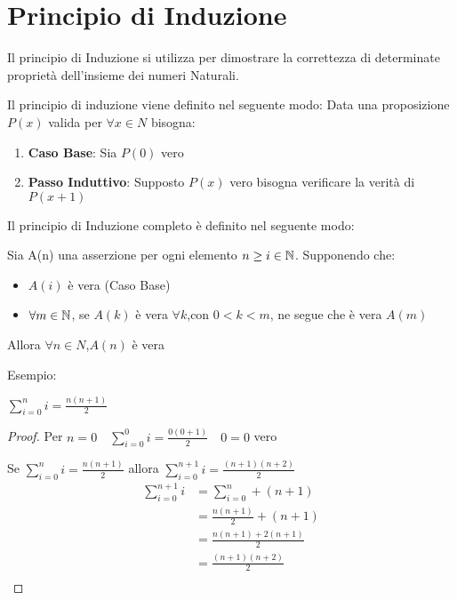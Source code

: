 \section{Principio di Induzione}
Il principio di Induzione si utilizza per dimostrare la correttezza di determinate
proprietà dell'insieme dei numeri Naturali.

Il principio di induzione viene definito nel seguente modo:\newline
Data una proposizione $P(x)$ valida per $\forall x \in N$ bisogna:
\begin{enumerate}
  \item \textbf{Caso Base}: Sia $P(0)$ vero
  \item \textbf{Passo Induttivo}: Supposto $P(x)$ vero  bisogna verificare la verità di $P(x+1)$
\end{enumerate}

Il principio di Induzione completo è definito nel seguente modo:
\begin{defi}
Sia A(n) una asserzione per ogni elemento $n \geq i \in \mathbb{N}$. Supponendo che:
\begin{itemize}
    \item $A(i)$ è vera (Caso Base)
    \item $\forall m \in \mathbb{N}$, se $A(k)$ è vera $\forall k$,con $0 < k < m$, ne segue
          che è vera $A(m)$
\end{itemize}
Allora $\forall n \in N$,$A(n)$ è vera
\end{defi}

Esempio:\newline
\begin{thm}$\displaystyle \sum_{i = 0} ^ n i = \frac{n(n + 1)}{2}$ \end{thm}

\begin{proof}
Per $n = 0 \quad \displaystyle \sum_{i = 0} ^ 0 i = \frac{0(0 + 1)}{2} \quad 0 = 0$ vero

Se $\displaystyle \sum_{i = 0} ^ n i = \frac{n(n+1)}{2}$ allora
$\displaystyle \sum_{i = 0} ^ {n+1} i = \frac{(n+1)(n+2)}{2}$
\begin{equation*}
\begin{split}
  \sum_{i = 0}^{n+1} i & = \sum_{i = 0} ^ n + (n+1) \\
                     & = \frac{n(n+1)}{2} + (n+1) \\
                     & = \frac{n(n+1) + 2(n+1)}{2} \\
                     & = \frac{(n+1)(n+2)}{2} \\
\end{split}
\end{equation*}
\end{proof}

